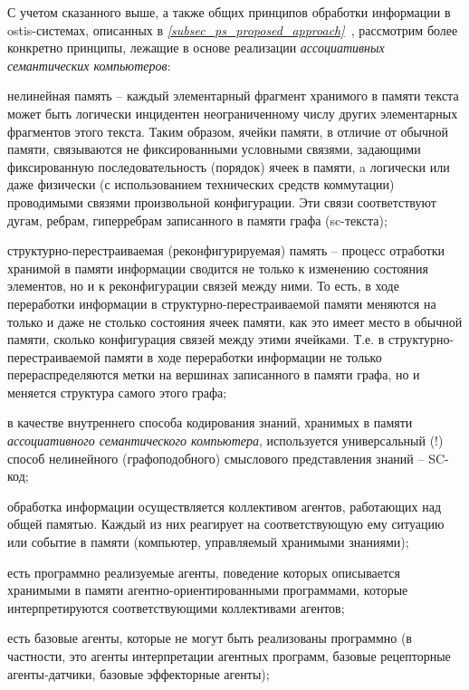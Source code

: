 С учетом сказанного выше, а также общих принципов обработки информации в ostis-системах, описанных в \textit{\ref{subsec_ps_proposed_approach}~}, рассмотрим более конкретно принципы, лежащие в основе реализации \textit{ассоциативных семантических компьютеров}:
\begin{textitemize}
	\item нелинейная память -- каждый элементарный фрагмент хранимого в памяти текста может быть логически инцидентен неограниченному числу других элементарных фрагментов этого текста. Таким образом, ячейки памяти, в отличие от обычной памяти, связываются не фиксированными условными связями, задающими фиксированную последовательность (порядок) ячеек в памяти, a логически или даже физически (с использованием технических средств коммутации) проводимыми связями произвольной конфигурации. Эти связи соответствуют дугам, ребрам, гиперребрам записанного в памяти графа (sc-текста);
	\item структурно-перестраиваемая (реконфигурируемая) память -- процесс отработки хранимой в памяти информации сводится не только к изменению состояния элементов, но и к реконфигурации связей между ними. То есть, в ходе переработки информации в структурно-перестраиваемой памяти меняются на только и даже не столько состояния ячеек памяти, как это имеет место в обычной памяти, сколько конфигурация связей между этими ячейками. Т.е. в структурно-перестраиваемой памяти в ходе переработки информации не только перераспределяются метки на вершинах записанного в памяти графа, но и меняется структура самого этого графа;	
	\item в качестве внутреннего способа кодирования знаний, хранимых в памяти \textit{ассоциативного семантического компьютера}, используется универсальный (!) способ нелинейного (графоподобного) смыслового представления знаний -- SC-код;
	\item обработка информации осуществляется коллективом агентов, работающих над общей памятью. Каждый из них реагирует на соответствующую ему ситуацию или событие в памяти (компьютер, управляемый хранимыми знаниями);
	\item есть программно реализуемые агенты, поведение которых описывается хранимыми в памяти агентно-ориентированными программами, которые интерпретируются соответствующими коллективами агентов;
	\item есть базовые агенты, которые не могут быть реализованы программно (в частности, это агенты интерпретации агентных программ, базовые рецепторные агенты-датчики, базовые эффекторные агенты);

\end{textitemize}

